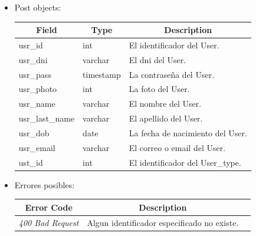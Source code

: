 \documentclass{article}
\begin{document}
\begin{enumerate}
\begin{itemize}
\begin{table}[H]
\begin{tabular}{|l|l|l|l|}
        \hline \end{tabular} \end{table}
        \item Post objects:
        \begin{table}[H] \centering \begin{tabular}{|l|l|l|} \hline
        \multicolumn{1}{|c|}{\textbf{Field}} &
        \multicolumn{1}{c|}{\textbf{Type}} &
        \multicolumn{1}{c|}{\textbf{Description}} \\ \hline usr\_id & int & El
        identificador del User. \\ \hline usr\_dni & varchar & El dni del User.
        \\ \hline usr\_pass & timestamp & La contraseña del User. \\ \hline
        usr\_photo & int & La foto del User. \\ \hline usr\_name & varchar & El
        nombre del User. \\ \hline usr\_last\_name & varchar & El apellido del
        User. \\ \hline usr\_dob & date & La fecha de nacimiento del User. \\
        \hline usr\_email & varchar & El correo o email del User. \\ \hline
        ust\_id & int & El identificador del User\_type. \\ \hline \end{tabular}
        \end{table}
        \item Errores posibles: \begin{table}[H] \centering
        \begin{tabular}{|c|c|l|} \hline \textbf{Error Code} &
        \textbf{Description} \\ \hline \textit{400 Bad Request} & Algun
        identificador especificado no existe. \\ \hline \end{tabular}
        \end{table}
    \end{itemize}


\end{enumerate}
\end{document}
